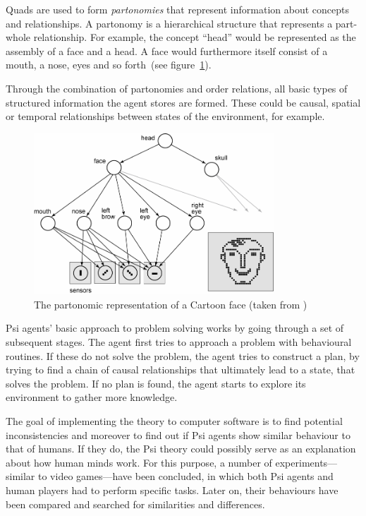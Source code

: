 Quads are used to form \emph{partonomies} that represent information about concepts and relationships. A partonomy is a hierarchical structure that represents a part-whole relationship. For example, the concept ``head'' would be represented as the assembly of a face and a head. A face would furthermore itself consist of a mouth, a nose, eyes and so forth~(see figure~\ref{partonomy}). 

Through the combination of partonomies and order relations, all basic types of structured information the agent stores are formed. These could be causal, spatial or temporal relationships between states of the environment, for example.

\begin{figure}[h]
  \centering
    \includegraphics[width=9cm]{graphics/partonomy}
  \caption[The partonomic representation of a Cartoon face]{The partonomic representation of a Cartoon face (taken from \cite{Bach:2009:PSI:1611304})}
  \label{partonomy}
\end{figure}

Psi agents' basic approach to problem solving works by going through a set of subsequent stages. The agent first tries to approach a problem with behavioural routines. If these do not solve the problem, the agent tries to construct a plan, by trying to find a chain of causal relationships that ultimately lead to a state, that solves the problem. If no plan is found, the agent starts to explore its environment to gather more knowledge.

The goal of implementing the theory to computer software is to find potential inconsistencies and moreover to find out if Psi agents show similar behaviour to that of humans. If they do, the Psi theory could possibly serve as an explanation about how human minds work. For this purpose, a number of experiments---similar to video games---have been concluded, in which both Psi agents and human players had to perform specific tasks. Later on, their behaviours have been compared and searched for similarities and differences.

